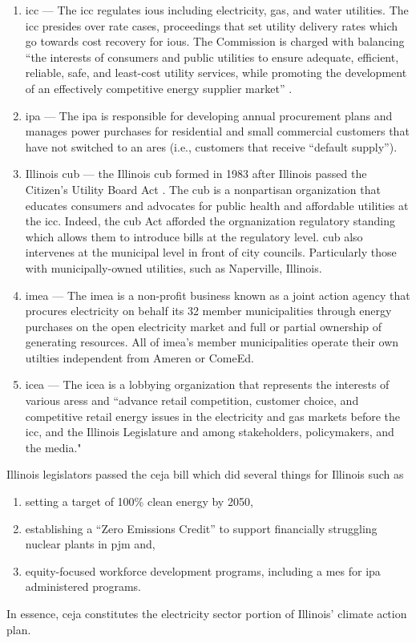\begin{enumerate}
    \item \acf{icc} --- The \ac{icc} regulates \acp{iou} including electricity,
    gas, and water utilities. The \ac{icc} presides over rate cases, proceedings
    that set utility delivery rates which go towards cost recovery for
    \acp{iou}. The Commission is charged with balancing ``the interests of
    consumers and public utilities to ensure adequate, efficient, reliable,
    safe, and least-cost utility services, while promoting the development of an
    effectively competitive energy supplier market''
    \cite{illinois_commerce_commision_icc_citizens_2022}.
    \item \acf{ipa} --- The \ac{ipa} is responsible for developing annual
    procurement plans and manages power purchases for residential and small
    commercial customers that have not switched to an \ac{ares} (i.e., customers
    that receive ``default supply'').
    \item Illinois \acf{cub} --- the Illinois \ac{cub} formed in 1983 after
    Illinois passed the Citizen's Utility Board Act
    \cite{illinois_83rd_general_assembly_citizens_1983}. The \ac{cub} is a
    nonpartisan organization that educates consumers and advocates for public
    health and affordable utilities at the \ac{icc}. Indeed, the \ac{cub} Act
    afforded the orgnanization regulatory standing which allows them to
    introduce bills at the regulatory level. \ac{cub} also intervenes at the
    municipal level in front of city councils. Particularly those with
    municipally-owned utilities, such as Naperville, Illinois.
    \item \acf{imea} --- The \ac{imea} is a non-profit business known as a joint
    action agency that procures electricity on behalf its 32 member
    municipalities through energy purchases on the open electricity market and
    full or partial ownership of generating resources. All of \ac{imea}'s member
    municipalities operate their own utilties independent from Ameren or ComeEd.
    \item \acf{icea} --- The \ac{icea} is a lobbying organization that
    represents the interests of various \acp{ares} and ``advance retail
    competition, customer choice, and competitive retail energy issues in the
    electricity and gas markets before the \ac{icc}, and the Illinois
    Legislature and among stakeholders, policymakers, and the media."
\end{enumerate}

\noindent
Illinois legislators passed the \ac{ceja} bill \cite{harmon_climate_2021} which
did several things for Illinois such as
\begin{enumerate}
    \item setting a target of 100\% clean energy by 2050,
    \item establishing a ``Zero Emissions Credit'' to support financially
    struggling nuclear plants in \ac{pjm} and,
    \item equity-focused workforce development programs, including a \acf{mes}
    for \ac{ipa} administered programs.
\end{enumerate}
In essence, \ac{ceja} constitutes the electricity sector portion of Illinois'
climate action plan.

